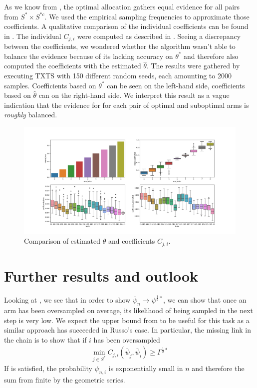 As we know from , the optimal allocation
gathers equal evidence for all pairs from $S^* \times S^{*c}$. We used the
empirical sampling frequencies to approximate those coefficients. A qualitative
comparison of the individual coefficients can be found in
. The individual $C_{j, i}$ were computed as
described in . Seeing a discrepancy
between the coefficients, we wondered whether the algorithm wasn't able to
balance the evidence because of its lacking accuracy on $\theta^*$ and therefore
also computed the coefficients with the estimated $\hat{\theta}$. The results
were gathered by executing TXTS with 150 different random seeds, each amounting to 2000 samples. Coefficients based on $\theta^*$ can be seen on the left-hand side, coefficients based on $\hat{\theta}$ can on the right-hand side. We interpret this result as a vague indication that the evidence for for each pair of optimal and suboptimal arms is \emph{roughly} balanced.
\begin{figure}[h]
  \centering
  \includegraphics[width=1.2\textwidth]{190909-coefficients_2000.png}
  \caption{Comparison of estimated $\theta$ and coefficients $C_{j, i}$.}
  \label{fig:algorithm_coefficients}
\end{figure}

\section{Further results and outlook}\label{section:further_results}

Looking at , we see that in
order to show $\bar{\psi}_n \rightarrow \psi^{\frac{1}{2}*}$, we can show that
once an arm has been oversampled on average, its likelihood of being sampled in
the next step is very low. We expect the upper bound from
 to be useful for this task as a similar approach has
succeeded in Russo's case. In particular, the missing link in the chain is to
show that if $i$ has been oversampled
\begin{align}
  \min_{j \in S^*} C_{j, i}(\bar{\psi}_j, \bar{\psi}_i) \geq
      \Gamma^{\frac{1}{2}*} \label{eq:missing_link}
\end{align}
If  is satisfied, the
probability $\psi_{n, i}$ is exponentially small in $n$ and therefore the sum
from  finite by the geometric
series.

